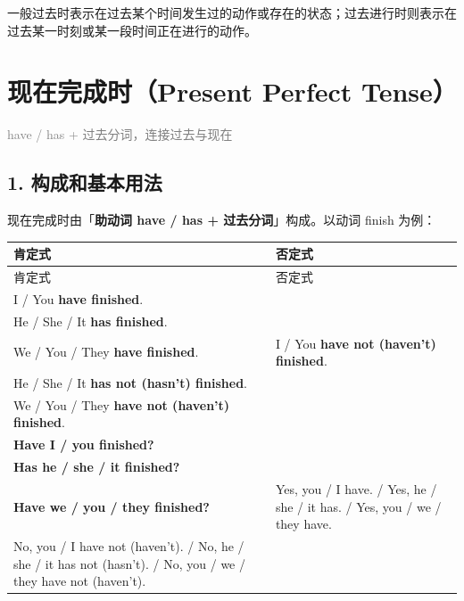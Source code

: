 \documentclass[11pt,a4paper]{ctexart}
\begin{document}
一般过去时表示在过去某个时间发生过的动作或存在的状态；过去进行时则表示在过去某一时刻或某一段时间正在进行的动作。

\section{现在完成时（Present Perfect Tense）}
\noindent\textcolor{gray}{have / has + 过去分词，连接过去与现在}\par\smallskip
\subsection*{1. 构成和基本用法}

现在完成时由「\textbf{助动词 have / has + 过去分词}」构成。以动词 finish 为例：

{\footnotesize
\begin{longtable}{p{6.70cm}p{6.70cm}}
\hline
肯定式 & 否定式 \\
\hline
\endfirsthead
\hline
肯定式 & 否定式 \\
\hline
\endhead
\hline
\endfoot
I / You \textbf{have finished}.\\ He / She / It \textbf{has finished}.\\ We / You / They \textbf{have finished}. & I / You \textbf{have not (haven’t) finished}.\\ He / She / It \textbf{has not (hasn’t) finished}.\\ We / You / They \textbf{have not (haven’t) finished}. \\
\textbf{Have I / you finished?}\\ \textbf{Has he / she / it finished?}\\ \textbf{Have we / you / they finished?} & Yes, you / I have. / Yes, he / she / it has. / Yes, you / we / they have.\\ No, you / I have not (haven’t). / No, he / she / it has not (hasn’t). / No, you / we / they have not (haven’t). \\
\end{longtable}
}
\end{document}
